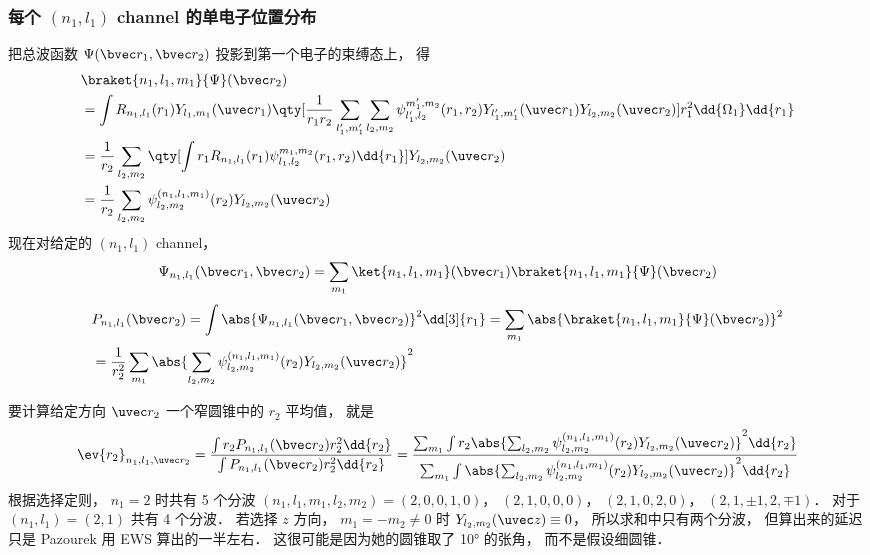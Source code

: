 \subsubsection{每个 $(n_1,l_1)$ channel 的单电子位置分布}
把总波函数 $\Psi(\bvec r_1, \bvec r_2)$ 投影到第一个电子的束缚态上， 得
\begin{equation}
\begin{aligned}
&\braket{n_1,l_1,m_1}{\Psi}(\bvec r_2)\\
&= \int R_{n_1, l_1}(r_1) Y_{l_1, m_1}(\uvec r_1) \qty[\frac{1}{r_1 r_2} \sum_{l_1',m_1'}\sum_{l_2, m_2} \psi_{l'_1,l_2}^{m'_1,m_2}(r_1,r_2) Y_{l'_1,m'_1}(\uvec r_1)Y_{l_2,m_2}(\uvec r_2)] r_1^2\dd{\Omega_1}\dd{r_1}\\
&= \frac{1}{r_2}\sum_{l_2,m_2} \qty[\int r_1 R_{n_1,l_1}(r_1) \psi_{l_1,l_2}^{m_1,m_2}(r_1,r_2) \dd{r_1}] Y_{l_2,m_2}(\uvec r_2)\\
&= \frac{1}{r_2}\sum_{l_2,m_2} \psi_{l_2,m_2}^{(n_1,l_1,m_1)}(r_2) Y_{l_2,m_2}(\uvec r_2)
\end{aligned}
\end{equation}
现在对给定的 $(n_1, l_1)$ channel， 
\begin{equation}
\Psi_{n_1,l_1}(\bvec r_1, \bvec r_2) = \sum_{m_1} \ket{n_1,l_1,m_1}(\bvec r_1) \braket{n_1,l_1,m_1}{\Psi}(\bvec r_2)
\end{equation}
\begin{equation}
\begin{aligned}
&P_{n_1,l_1}(\bvec r_2) = \int \abs{\Psi_{n_1,l_1}(\bvec r_1, \bvec r_2)}^2 \dd[3]{r_1}
= \sum_{m_1} \abs{\braket{n_1,l_1,m_1}{\Psi}(\bvec r_2)}^2\\
&= \frac{1}{r_2^2} \sum_{m_1} \abs{\sum_{l_2,m_2} \psi_{l_2,m_2}^{(n_1,l_1,m_1)}(r_2) Y_{l_2,m_2}(\uvec r_2)}^2
\end{aligned}
\end{equation}

要计算给定方向 $\uvec r_2$ 一个窄圆锥中的 $r_2$ 平均值， 就是
\begin{equation}\label{HeAnal_eq18}
\ev{r_2}_{n_1,l_1,\uvec r_2} = \frac{\int r_2 P_{n_1,l_1}(\bvec r_2) r_2^2 \dd{r_2}}{\int P_{n_1,l_1}(\bvec r_2) r_2^2 \dd{r_2}}
= \frac{\sum_{m_1} \int r_2\abs{\sum_{l_2,m_2} \psi_{l_2,m_2}^{(n_1,l_1,m_1)}(r_2) Y_{l_2,m_2}(\uvec r_2)}^2 \dd{r_2}}{\sum_{m_1} \int \abs{\sum_{l_2,m_2} \psi_{l_2,m_2}^{(n_1,l_1,m_1)}(r_2) Y_{l_2,m_2}(\uvec r_2)}^2\dd{r_2}}
\end{equation}
根据选择定则， $n_1 = 2$ 时共有 5 个分波 $(n_1,l_1,m_1,l_2,m_2) = (2, 0, 0, 1, 0)$， $(2,1,0,0,0)$， $(2,1,0,2,0)$， $(2,1,\pm 1, 2,\mp 1)$． 对于 $(n_1, l_1) = (2, 1)$ 共有 4 个分波． 若选择 $z$ 方向， $m_1 = -m_2 \ne 0$ 时 $Y_{l_2,m_2}(\uvec z) \equiv 0$， 所以求和中只有两个分波， 但算出来的延迟只是 Pazourek 用 EWS 算出的一半左右． 这很可能是因为她的圆锥取了 10° 的张角， 而不是假设细圆锥．


